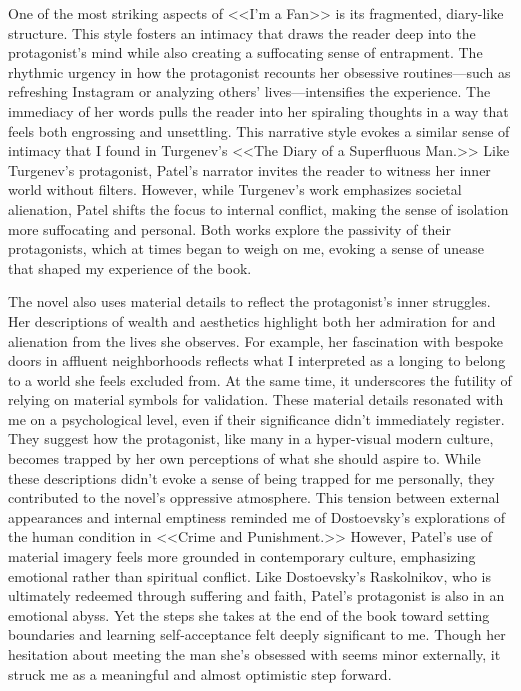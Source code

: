 One of the most striking aspects of <<I’m a Fan>> is its fragmented, diary-like structure. This style fosters an intimacy that draws the reader deep into the protagonist’s mind while also creating a suffocating sense of entrapment. The rhythmic urgency in how the protagonist recounts her obsessive routines—such as refreshing Instagram or analyzing others’ lives—intensifies the experience. The immediacy of her words pulls the reader into her spiraling thoughts in a way that feels both engrossing and unsettling. This narrative style evokes a similar sense of intimacy that I found in Turgenev’s <<The Diary of a Superfluous Man.>> Like Turgenev’s protagonist, Patel’s narrator invites the reader to witness her inner world without filters. However, while Turgenev’s work emphasizes societal alienation, Patel shifts the focus to internal conflict, making the sense of isolation more suffocating and personal. Both works explore the passivity of their protagonists, which at times began to weigh on me, evoking a sense of unease that shaped my experience of the book.

The novel also uses material details to reflect the protagonist’s inner struggles. Her descriptions of wealth and aesthetics highlight both her admiration for and alienation from the lives she observes. For example, her fascination with bespoke doors in affluent neighborhoods reflects what I interpreted as a longing to belong to a world she feels excluded from. At the same time, it underscores the futility of relying on material symbols for validation. These material details resonated with me on a psychological level, even if their significance didn’t immediately register. They suggest how the protagonist, like many in a hyper-visual modern culture, becomes trapped by her own perceptions of what she should aspire to. While these descriptions didn’t evoke a sense of being trapped for me personally, they contributed to the novel’s oppressive atmosphere. This tension between external appearances and internal emptiness reminded me of Dostoevsky’s explorations of the human condition in <<Crime and Punishment.>> However, Patel’s use of material imagery feels more grounded in contemporary culture, emphasizing emotional rather than spiritual conflict. Like Dostoevsky’s Raskolnikov, who is ultimately redeemed through suffering and faith, Patel’s protagonist is also in an emotional abyss. Yet the steps she takes at the end of the book toward setting boundaries and learning self-acceptance felt deeply significant to me. Though her hesitation about meeting the man she’s obsessed with seems minor externally, it struck me as a meaningful and almost optimistic step forward.

